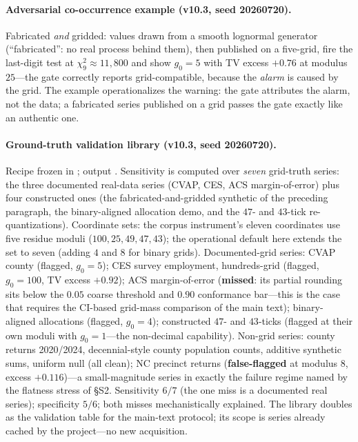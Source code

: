 \documentclass[12pt]{article}
\begin{document}
\paragraph{Adversarial co-occurrence example (v10.3, seed 20260720).}
Fabricated \emph{and} gridded: values drawn from a smooth lognormal
generator (``fabricated'': no real process behind them), then published on a
five-grid, fire the last-digit test at $\chi^2_9 \approx 11{,}800$ and show
$g_0 = 5$ with TV excess $+0.76$ at modulus $25$---the gate correctly
reports grid-compatible, because the \emph{alarm} is caused by the grid.
The example operationalizes the warning: the gate attributes the alarm, not
the data; a fabricated series published on a grid passes the gate exactly
like an authentic one.

\paragraph{Ground-truth validation library (v10.3, seed 20260720).}
Recipe frozen in ; output
. Sensitivity is computed over \emph{seven}
grid-truth series: the three documented real-data series (CVAP, CES, ACS
margin-of-error) plus four constructed ones (the fabricated-and-gridded
synthetic of the preceding paragraph, the binary-aligned allocation demo,
and the $47$- and $43$-tick re-quantizations). Coordinate sets: the corpus
instrument's eleven coordinates use five residue moduli
($100, 25, 49, 47, 43$); the operational default here extends the set to
seven (adding $4$ and $8$ for binary grids).
Documented-grid series: CVAP county (flagged, $g_0{=}5$); CES survey
employment, hundreds-grid (flagged, $g_0{=}100$, TV excess $+0.92$); ACS
margin-of-error (\textbf{missed}: its partial rounding sits below the
$0.05$ coarse threshold and $0.90$ conformance bar---this is the case that
requires the CI-based grid-mass comparison of the main text); binary-aligned
allocations (flagged, $g_0{=}4$); constructed $47$- and $43$-ticks (flagged
at their own moduli with $g_0{=}1$---the non-decimal capability). Non-grid
series: county returns 2020/2024, decennial-style county population counts,
additive synthetic sums, uniform null (all clean); NC precinct returns
(\textbf{false-flagged} at modulus $8$, excess $+0.116$)---a small-magnitude
series in exactly the failure regime named by the flatness stress of
\S S2. Sensitivity $6/7$ (the one miss is a documented real series);
specificity $5/6$; both misses mechanistically explained. The library doubles as the validation table for the main-text
protocol; its scope is series already cached by the project---no new
acquisition.



\end{document}
